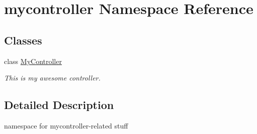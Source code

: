 \hypertarget{namespacemycontroller}{\section{mycontroller Namespace Reference}
\label{namespacemycontroller}
}
\subsection*{Classes}
\begin{DoxyCompactItemize}
\item 
class \hyperlink{classmycontroller_1_1MyController}{My\-Controller}
\begin{DoxyCompactList}\small\item\em This is my awesome controller. \end{DoxyCompactList}\end{DoxyCompactItemize}


\subsection{Detailed Description}
namespace for mycontroller-\/related stuff 